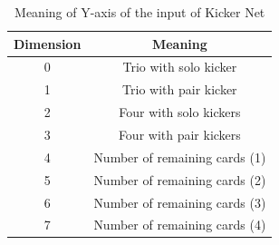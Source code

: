 \documentclass{article}
\begin{document}
\begin{table}[!ht]
    \caption{Meaning of Y-axis of the input of Kicker Net}\label{YoutKicker}
    \centering
    \begin{threeparttable}          
      \begin{tabular}{cc}\toprule
        
Dimension & Meaning                       \\ \hline
0         & Trio with solo kicker         \\
1         & Trio with pair kicker         \\
2         & Four with solo kickers        \\
3         & Four with pair kickers        \\
4         & Number of remaining cards (1) \\
5         & Number of remaining cards (2) \\
6         & Number of remaining cards (3) \\
7         & Number of remaining cards (4) \\ \hline
      \end{tabular}
    \end{threeparttable}  
  \end{table}
\end{document}
